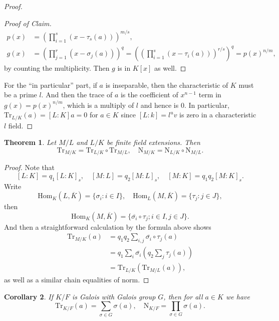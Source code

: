 \documentclass[12pt]{report}
\newtheorem{theorem}{Theorem}[section]
\newtheorem{corollary}[theorem]{Corollary}
\theoremstyle{definition}
\newtheorem{example}[theorem]{Example}
\newcommand{\charr}{\text{char}}
\newcommand{\Hom}{\text{Hom}}
\newcommand{\Gal}{\text{Gal}}
\newcommand{\Tr}{\text{Tr}}
\newcommand{\nm}{\text{N}}
\begin{document}
\begin{proof}
\begin{proof}[Proof of Claim]
		\begin{align*}
			p(x) & = (\prod_{i=1}^s(x-\tau_s(a)))^{m/s},                                                    \\
			g(x) & = (\prod_{j=1}^r(x-\sigma_j(a)))^q =((\prod_{i=1}^s(x-\tau_i(a)))^{r/s})^q = p(x)^{n/m},
		\end{align*} by counting the multiplicity. Then $g$ is in $K[x]$ as well.
	\end{proof}

	For the ``in particular'' part, if $a$ is inseparable, then the characteristic of $K$ must be a prime $l$. And then the trace of $a$ is the coefficient of $x^{n-1}$ term in $g(x)=p(x)^{n/m}$, which is a multiply of $l$ and hence is 0. In particular, $\Tr_{L/K}(a)=[L:K] a = 0$ for $a\in K$ since $[L:k]=l^uv$ is zero in a characteristic $l$ field.
\end{proof}

\begin{theorem}
	Let $M/L$ and $L/K$ be finite field extensions. Then $$\Tr_{M/K} = \Tr_{L/K}\circ\Tr_{M/L},\quad \nm_{M/K}=\nm_{L/K}\circ\nm_{M/L}.$$
\end{theorem}

\begin{proof}
	Note that $$[L:K]=q_1[L:K]_s,\quad [M:L]=q_2[M:L]_s,\quad [M:K]=q_1q_2[M:K]_s.$$ Write $$\Hom_K(L,\overline{K}) = \{\sigma_i: i \in I\},\quad \Hom_L(M,\overline{K}) = \{\tau_j: j \in J\},$$ then $$\Hom_K(M,\overline{K}) = \{\overline{\sigma_i} \circ \tau_j ; i \in I, j \in J\}.$$ And then a straightforward calculation by the formula above shows \begin{align*}
		\Tr_{M/K}(a) & =q_1q_2\sum_{i,j} \overline{\sigma_i}\circ\tau_j(a)  \\
		             & = q_1 \sum_i\overline{\sigma_i}(q_2\sum_j \tau_j(a)) \\
		             & =\Tr_{L/K}(\Tr_{M/L}(a)),
	\end{align*}
	as well as a similar chain equalities of norm.
\end{proof}

\begin{corollary}
	If $K/F$ is Galois with Galois group $G$, then for all $a\in K$ we have $$\Tr_{K/F}(a)=\sum_{\sigma\in G}\sigma(a),\quad \nm_{K/F}=\prod_{\sigma\in G}\sigma(a).$$
\end{corollary}

\end{document}
